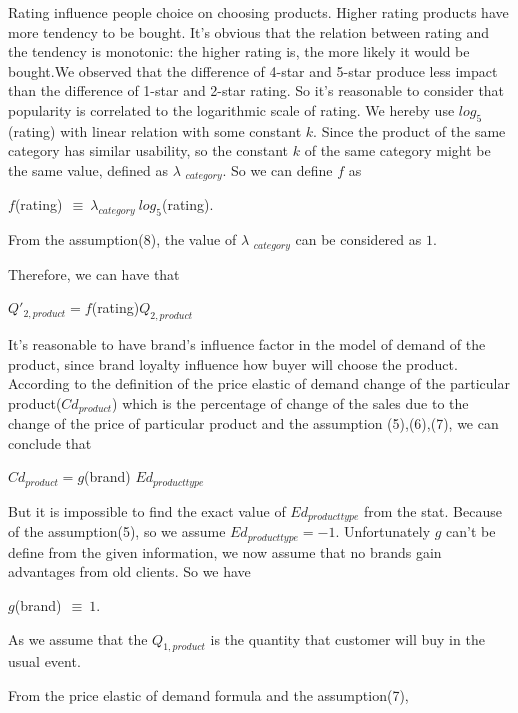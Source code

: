 \par Rating influence people choice on choosing products. Higher rating products have more tendency to be bought. It’s obvious that the relation between rating and the tendency is monotonic: the higher rating is, the more likely it would be bought.We observed that the difference of 4-star and 5-star produce less impact than the difference of 1-star and 2-star rating. So it's reasonable to consider that popularity is correlated to the logarithmic scale of rating. We hereby use $log_5$(rating) with linear relation with some constant $k$. Since the product of the same category has similar usability, so the constant $k$ of the same category might be the same value, defined as $\lambda$ $_{category}$. So we can define $f$ as
\newline

\begin{definition}
$f$(rating)$\ \ \equiv\ \lambda_{category}\ log_5$(rating).
\end{definition}

From the assumption(8), the value of $\lambda$ $_{category}$ can be considered as $1$.

Therefore, we can have that 
\begin{center}
    $Q'_{2,product}=f$(rating)$Q_{2,product}$
\end{center}

\par 
It’s reasonable to have brand's influence factor in the model of demand of the product, since brand loyalty influence how buyer will choose the product. According to the definition of the price elastic of demand change of the particular product($Cd_{product}$) which is the percentage of change of the sales due to the change of the price of particular product and the assumption (5),(6),(7), we can conclude that 
\begin{center}
    $Cd_{product}=g$(brand) $Ed_{product type}$
\end{center}
But it is impossible to find the exact value of $Ed_{product type}$ from the stat. Because of the assumption(5), so we assume $Ed_{product type}=-1$. Unfortunately $g$ can’t be define from the given information, we now assume that no brands gain advantages from old clients. So we have 
\begin{definition}
$g$(brand)$\ \ \equiv\ 1.$ 
\end{definition}

As we assume that the $Q_{1,product}$ is the quantity that customer will buy in the usual event.
\par From the price elastic of demand formula and the assumption(7),

